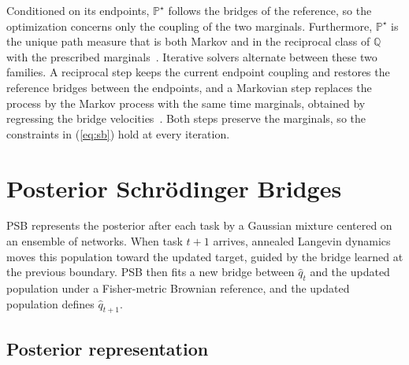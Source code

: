 \documentclass{article}
\begin{document}
Conditioned on its
endpoints, $\mathbb{P}^\star$ follows the bridges of the reference, so the
optimization concerns only the coupling of the two marginals. Furthermore,
$\mathbb{P}^\star$ is the unique path measure that is both Markov and in the
reciprocal class of $\mathbb{Q}$ with the prescribed
marginals~\cite{shi2023dsbm}. Iterative solvers alternate between these two
families. A reciprocal step keeps the current endpoint coupling and restores the reference bridges between the endpoints, and a Markovian step replaces the
process by the Markov process with the same time marginals, obtained by
regressing the bridge velocities~\cite{debortoli2021dsb,shi2023dsbm,peluchetti2023idbm}.
Both steps preserve the marginals, so the constraints in (\ref{eq:sb}) hold at every iteration.


\section{Posterior Schr\"odinger Bridges}
\label{sec:method}

PSB represents the posterior after each task by a Gaussian mixture centered on
an ensemble of networks. When task $t+1$ arrives, annealed Langevin dynamics
moves this population toward the updated target, guided by the bridge learned at
the previous boundary. PSB then fits a new bridge between $\hat q_t$ and the
updated population under a Fisher-metric Brownian reference, and the updated
population defines $\hat q_{t+1}$.

\subsection{Posterior representation}
\label{sec:representation}
\end{document}
